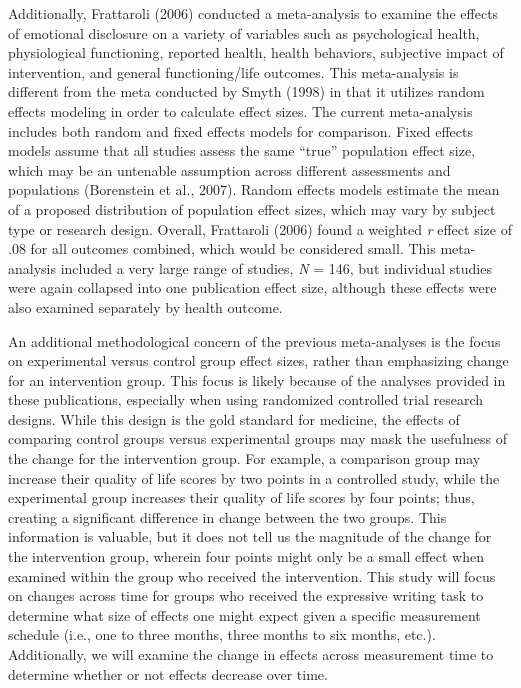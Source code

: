 \documentclass[english,man]{apa6}
\theoremstyle{definition}
\theoremstyle{definition}
\theoremstyle{definition}
\theoremstyle{remark}
\begin{document}
Additionally, Frattaroli (2006) conducted a meta-analysis to examine the
effects of emotional disclosure on a variety of variables such as
psychological health, physiological functioning, reported health, health
behaviors, subjective impact of intervention, and general
functioning/life outcomes. This meta-analysis is different from the meta
conducted by Smyth (1998) in that it utilizes random effects modeling in
order to calculate effect sizes. The current meta-analysis includes both
random and fixed effects models for comparison. Fixed effects models
assume that all studies assess the same \enquote{true} population effect
size, which may be an untenable assumption across different assessments
and populations (Borenstein et al., 2007). Random effects models
estimate the mean of a proposed distribution of population effect sizes,
which may vary by subject type or research design. Overall, Frattaroli
(2006) found a weighted \emph{r} effect size of .08 for all outcomes
combined, which would be considered small. This meta-analysis included a
very large range of studies, \emph{N} = 146, but individual studies were
again collapsed into one publication effect size, although these effects
were also examined separately by health outcome.

An additional methodological concern of the previous meta-analyses is
the focus on experimental versus control group effect sizes, rather than
emphasizing change for an intervention group. This focus is likely
because of the analyses provided in these publications, especially when
using randomized controlled trial research designs. While this design is
the gold standard for medicine, the effects of comparing control groups
versus experimental groups may mask the usefulness of the change for the
intervention group. For example, a comparison group may increase their
quality of life scores by two points in a controlled study, while the
experimental group increases their quality of life scores by four
points; thus, creating a significant difference in change between the
two groups. This information is valuable, but it does not tell us the
magnitude of the change for the intervention group, wherein four points
might only be a small effect when examined within the group who received
the intervention. This study will focus on changes across time for
groups who received the expressive writing task to determine what size
of effects one might expect given a specific measurement schedule (i.e.,
one to three months, three months to six months, etc.). Additionally, we
will examine the change in effects across measurement time to determine
whether or not effects decrease over time.
\end{document}
